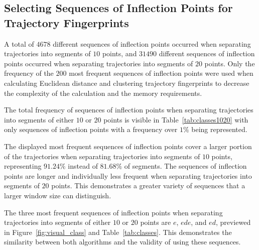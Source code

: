 \documentclass[preprint,12pt]{elsarticle}
\begin{document}
\subsection{Selecting Sequences of Inflection Points for Trajectory Fingerprints}

A total of $4678$ different sequences of inflection points occurred when separating trajectories into segments of $10$ points, and $31490$ different sequences of inflection points occurred when separating trajectories into segments of $20$ points. Only the frequency of the $200$ most frequent sequences of inflection points were used when calculating Euclidean distance and clustering trajectory fingerprints to decrease the complexity of the calculation and the memory requirements.

The total frequency of sequences of inflection points when separating trajectories into segments of either $10$ or $20$ points is visible in Table~\ref{tab:classes1020} with only sequences of inflection points with a frequency over $1\%$ being represented.

The displayed most frequent sequences of inflection points cover a larger portion of the trajectories when separating trajectories into segments of $10$ points, representing $91.24\%$ instead of $81.68\%$ of segments. The sequences of inflection points are longer and individually less frequent when separating trajectories into segments of $20$ points. This demonstrates a greater variety of sequences that a larger window size can distinguish.

The three most frequent sequences of inflection points when separating trajectories into segments of either $10$ or $20$ points are $e$, $ede$, and $ed$, previewed in Figure~\ref{fig:visual_class} and Table~\ref{tab:classes}. This demonstrates the similarity between both algorithms and the validity of using these sequences.
\end{document}
